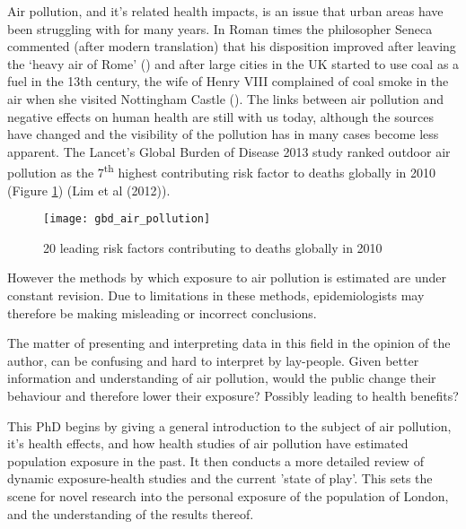 Air pollution, and it's related health impacts, is an issue that urban areas have been struggling with for many years. In Roman times the philosopher Seneca commented (after modern translation) that his disposition improved after leaving the ‘heavy air of Rome’ (\cite{seneca1969}) and after large cities in the UK started to use coal as a fuel in the 13th century, the wife of Henry VIII complained of coal smoke in the air when she visited Nottingham Castle (\cite{Brimblecombe1999}). The links between air pollution and negative effects on human health are still with us today, although the sources have changed and the visibility of the pollution has in many cases become less apparent. The Lancet's Global Burden of Disease 2013 study ranked outdoor air pollution as the  7\textsuperscript{th} highest contributing risk factor to deaths globally in 2010 (Figure \ref{fig:gbd_air_pollution}) (Lim et al (2012)).\hfill

\begin{figure}[H]
\centering
\texttt{[image: gbd\_air\_pollution]}
\caption{20 leading risk factors contributing to deaths globally in 2010}
\label{fig:gbd_air_pollution}
\end{figure}

However the methods by which exposure to air pollution is estimated are under constant revision. Due to limitations in these methods, epidemiologists may therefore be making misleading or incorrect conclusions.\hfill

The matter of presenting and interpreting data in this field in the opinion of the author, can be confusing and hard to interpret by lay-people. Given better information and understanding of air pollution, would the public change their behaviour and therefore lower their exposure? Possibly leading to health benefits?\hfill

This PhD begins by giving a general introduction to the subject of air pollution, it's health effects, and how health studies of air pollution have estimated population exposure in the past. It then conducts a more detailed review of dynamic exposure-health studies and the current 'state of play'. This sets the scene for novel research into the personal exposure of the population of London, and the understanding of the results thereof.\hfill